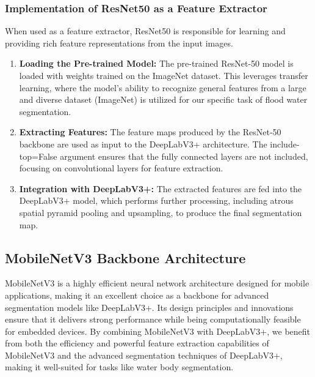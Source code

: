 \subsubsection{Implementation of ResNet50 as a Feature Extractor}
When used as a feature extractor, ResNet50 is responsible for learning and providing rich feature representations from the input images.
\begin{enumerate}
    \item \textbf{Loading the Pre-trained Model:} The pre-trained ResNet-50 model is loaded with weights trained on the ImageNet dataset. This leverages transfer learning, where the model's ability to recognize general features from a large and diverse dataset (ImageNet) is utilized for our specific task of flood water segmentation.
    \item \textbf{Extracting Features: }The feature maps produced by the ResNet-50 backbone are used as input to the DeepLabV3+ architecture. The include-top=False argument ensures that the fully connected layers are not included, focusing on convolutional layers for feature extraction.
    \item \textbf{Integration with DeepLabV3+: }The extracted features are fed into the DeepLabV3+ model, which performs further processing, including atrous spatial pyramid pooling and upsampling, to produce the final segmentation map.
\end{enumerate}


\subsection{MobileNetV3 Backbone Architecture}
MobileNetV3 is a highly efficient neural network architecture designed for mobile applications, making it an excellent choice as a backbone for advanced segmentation models like DeepLabV3+. Its design principles and innovations ensure that it delivers strong performance while being computationally feasible for embedded devices.
By combining MobileNetV3 with DeepLabV3+, we benefit from both the efficiency and powerful feature extraction capabilities of MobileNetV3 and the advanced segmentation techniques of DeepLabV3+, making it well-suited for tasks like water body segmentation.


